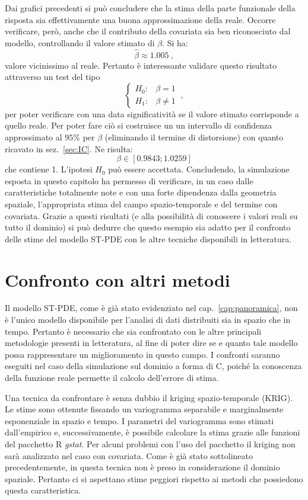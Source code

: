 \documentclass[a4paper,11pt,twoside,openright]{book}							%
\begin{document}
Dai grafici precedenti si può concludere che la stima della parte funzionale della risposta sia effettivamente una buona approssimazione della reale. Occorre verificare, però, anche che il contributo della covariata sia ben riconosciuto dal modello, controllando il valore stimato di $\beta$. Si ha:
$$
\hat{\beta} \approx 1.005 \ ,
$$
valore vicinissimo al reale. Pertanto è interessante validare questo risultato attraverso un test del tipo
$$
\begin{cases}
H_0: & \beta=1 \\
H_1: & \beta \not = 1
\end{cases} \ ,
$$
per poter verificare con una data significatività se il valore stimato corrisponde a quello reale. Per poter fare ciò si costruisce un un intervallo di confidenza approssimato al $95\%$ per $\beta$ (eliminando il termine di distorsione) con quanto ricavato in sez.~\ref{sec:IC}. Ne risulta:
$$
\beta \in [0.9843;1.0259]
$$
che contiene 1. L'ipotesi $H_0$ può essere accettata.
\newpage
Concludendo, la simulazione esposta in questo capitolo ha permesso di verificare, in un caso dalle caratteristiche totalmente note e con una forte dipendenza dalla geometria spaziale, l'appropriata stima del campo spazio-temporale e del termine con covariata. Grazie a questi risultati (e alla possibilità di conoscere i valori reali su tutto il dominio) si può dedurre che questo esempio sia adatto per il confronto delle stime del modello ST-PDE con le altre tecniche disponibili in letteratura.
\newpage
\thispagestyle{empty}

\chapter{Confronto con altri metodi}
\label{cap:confronto}

Il modello ST-PDE, come è già stato evidenziato nel cap.~\ref{cap:panoramica}, non è l'unico modello disponibile per l'analisi di dati distribuiti sia in spazio che in tempo. Pertanto è necessario che sia confrontato con le altre principali metodologie presenti in letteratura, al fine di poter dire se e quanto tale modello possa rappresentare un miglioramento in questo campo. I confronti saranno eseguiti nel caso della simulazione sul dominio a forma di C, poiché la conoscenza della funzione reale permette il calcolo dell'errore di stima. 

Una tecnica da confrontare è senza dubbio il kriging spazio-temporale (KRIG). Le stime sono ottenute fissando un variogramma separabile e marginalmente esponenziale in spazio e tempo. I parametri del variogramma sono stimati dall'empirico e, successivamente, è possibile calcolare la stima grazie alle funzioni del pacchetto R \textit{gstat}. Per alcuni problemi con l'uso del pacchetto il kriging non sarà analizzato nel caso con covariata. Come è già stato sottolineato precedentemente, in questa tecnica non è preso in considerazione il dominio spaziale. Pertanto ci si aspettano stime peggiori rispetto ai metodi che possiedono questa caratteristica.
\end{document}
